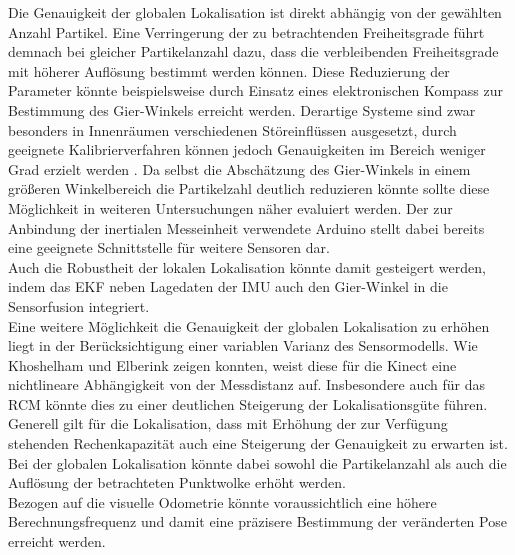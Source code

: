 Die Genauigkeit der globalen Lokalisation ist direkt abhängig von der gewählten Anzahl Partikel. Eine Verringerung der zu betrachtenden Freiheitsgrade führt demnach bei gleicher Partikelanzahl dazu, dass die verbleibenden Freiheitsgrade mit höherer Auflösung bestimmt werden können. Diese Reduzierung der Parameter könnte beispielsweise durch Einsatz eines elektronischen Kompass zur Bestimmung des Gier-Winkels erreicht werden. Derartige Systeme sind zwar besonders in Innenräumen verschiedenen Störeinflüssen ausgesetzt, durch geeignete Kalibrierverfahren können jedoch Genauigkeiten im Bereich weniger Grad erzielt werden \cite{Li2011}. Da selbst die Abschätzung des Gier-Winkels in einem größeren Winkelbereich die Partikelzahl deutlich reduzieren könnte sollte diese Möglichkeit in weiteren Untersuchungen näher evaluiert werden. Der zur Anbindung der inertialen Messeinheit verwendete Arduino stellt dabei bereits eine geeignete Schnittstelle für weitere Sensoren dar.\\
Auch die Robustheit der lokalen Lokalisation könnte damit gesteigert werden, indem das EKF neben Lagedaten der IMU auch den Gier-Winkel in die Sensorfusion integriert.\\

Eine weitere Möglichkeit die Genauigkeit der globalen Lokalisation zu erhöhen liegt in der Berücksichtigung einer variablen Varianz des Sensormodells. Wie Khoshelham und Elberink \cite{Khoshelham2012} zeigen konnten, weist diese für die Kinect eine nichtlineare Abhängigkeit von der Messdistanz auf. Insbesondere auch für das RCM könnte dies zu einer deutlichen Steigerung der Lokalisationsgüte führen.\\

Generell gilt für die Lokalisation, dass mit Erhöhung der zur Verfügung stehenden Rechenkapazität auch eine Steigerung der Genauigkeit zu erwarten ist. Bei der globalen Lokalisation könnte dabei sowohl die Partikelanzahl als auch die Auflösung der betrachteten Punktwolke erhöht werden.\\
Bezogen auf die visuelle Odometrie könnte voraussichtlich eine höhere Berechnungsfrequenz und damit eine präzisere Bestimmung der veränderten Pose erreicht werden.\\

